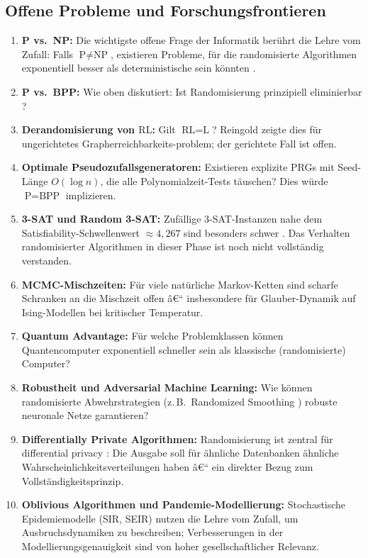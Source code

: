 ﻿\documentclass[12pt,a4paper]{article}
\theoremstyle{definition}
\theoremstyle{plain}
\theoremstyle{remark}
\begin{document}
\subsection{Offene Probleme und Forschungsfrontieren}

\begin{enumerate}[label=\textbf{\arabic*.}]
  \item \textbf{P vs.\ NP:} Die wichtigste offene Frage der Informatik
    berührt die Lehre vom Zufall: Falls $\text{P} \neq \text{NP}$, existieren
    Probleme, für die randomisierte Algorithmen exponentiell besser als
    deterministische sein könnten \cite{cook1971complexity}.
  \item \textbf{P vs.\ BPP:} Wie oben diskutiert: Ist Randomisierung
    prinzipiell eliminierbar \cite{impagliazzo1997p}?
  \item \textbf{Derandomisierung von $\text{RL}$:} Gilt
    $\text{RL} = \text{L}$? Reingold \cite{reingold2008undirected} zeigte
    dies für ungerichtetes Grapherreichbarkeits-problem; der gerichtete Fall
    ist offen.
  \item \textbf{Optimale Pseudozufallsgeneratoren:} Existieren explizite
    PRGs mit Seed-Länge $O(\log n)$, die alle Polynomialzeit-Tests täuschen?
    Dies würde $\text{P} = \text{BPP}$ implizieren.
  \item \textbf{3-SAT und Random 3-SAT:} Zufällige 3-SAT-Instanzen nahe
    dem Satisfiability-Schwellenwert $\approx 4{,}267$ sind besonders schwer
    \cite{mertens2006threshold}. Das Verhalten randomisierter Algorithmen
    in dieser Phase ist noch nicht vollständig verstanden.
  \item \textbf{MCMC-Mischzeiten:} Für viele natürliche Markov-Ketten
    sind scharfe Schranken an die Mischzeit offen â€“ insbesondere für
    Glauber-Dynamik auf Ising-Modellen bei kritischer Temperatur.
  \item \textbf{Quantum Advantage:} Für welche Problemklassen können
    Quantencomputer exponentiell schneller sein als klassische
    (randomisierte) Computer?
  \item \textbf{Robustheit und Adversarial Machine Learning:} Wie können
    randomisierte Abwehrstrategien (z.\,B.\ Randomized Smoothing
    \cite{cohen2019certified}) robuste neuronale Netze garantieren?
  \item \textbf{Differentially Private Algorithmen:} Randomisierung ist
    zentral für differential privacy \cite{dwork2014algorithmic}:
    Die Ausgabe soll für ähnliche Datenbanken ähnliche Wahrscheinlichkeitsverteilungen
    haben â€“ ein direkter Bezug zum Vollständigkeitsprinzip.
  \item \textbf{Oblivious Algorithmen und Pandemie-Modellierung:}
    Stochastische Epidemiemodelle (SIR, SEIR) \cite{anderson1991infectious}
    nutzen die Lehre vom Zufall, um Ausbruchsdynamiken zu beschreiben;
    Verbesserungen in der Modellierungsgenauigkeit sind von hoher
    gesellschaftlicher Relevanz.
\end{enumerate}
\end{document}

